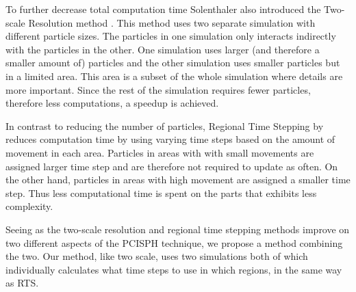 \documentclass[../../main.tex]{subfiles}
\begin{document}
To further decrease total computation time Solenthaler also introduced the Two-scale Resolution method \citep{solenthaler2011two}. This method uses two separate simulation with different particle sizes. The particles in one simulation only interacts indirectly with the particles in the other. One simulation uses larger (and therefore a smaller amount of) particles and the other simulation uses smaller particles but in a limited area. This area is a subset of the whole simulation where details are more important. Since the rest of the simulation requires fewer particles, therefore less computations, a speedup is achieved. 

In contrast to reducing the number of particles, Regional Time Stepping by \citet{goswami2014regional} reduces computation time by using varying time steps based on the amount of movement in each area. Particles in areas with with small movements are assigned larger time step and are therefore not required to update as often. On the other hand, particles in areas with high movement are assigned a smaller time step. Thus less computational time is spent on the parts that exhibits less complexity.


Seeing as the two-scale resolution and regional time stepping methods improve on two different aspects of the PCISPH technique, we propose a method combining the two. Our method, like two scale, uses two simulations both of which individually calculates what time steps to use in which regions, in the same way as RTS. 

\end{document}
